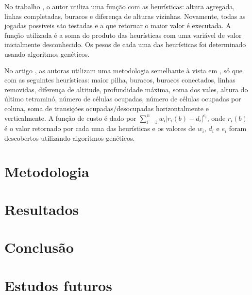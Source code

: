 \documentclass[conference]{IEEEtran}
\begin{document}
No trabalho \cite{b9}, o autor utiliza uma função com as heurísticas: altura agregada, linhas completadas, buracos e diferença de alturas vizinhas. Novamente, todas as jogadas possíveis são testadas e a que retornar o maior valor é executada. A função utilizada é a soma do produto das heurísticas com uma variável de valor inicialmente desconhecido. Os pesos de cada uma das heurísticas foi determinado usando algoritmos genéticos. 

No artigo \cite{b10}, as autoras utilizam uma metodologia semelhante à vista em \cite{b9}, só que com as seguintes heurísticas: maior pilha, buracos, buracos conectados, linhas removidas, diferença de altitude, profundidade máxima, soma dos vales, altura do último tetraminó, número de células ocupadas, número de células ocupadas por coluna, soma de transições ocupadas/desocupadas horizontalmente e verticalmente. A função de custo é dado por $\sum_{i=1}^n  w_{i}|r_{i}(b)-d_{i} | ^{e_{i}}$, onde $r_{i}(b)$ é o valor retornado por cada uma das heurísticas e os valores de $w_i$, $d_i$ e $e_i$ foram descobertos utilizando algoritmos genéticos.


\section{Metodologia}

\section{Resultados}

\section{Conclusão}

\section{Estudos futuros}
\end{document}
